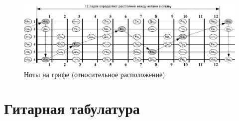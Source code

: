 \begin{figure}[!ht]
    \centering
    \includegraphics[width=\textwidth]{fig/notes-on-griph} 
    \caption{Ноты на грифе (относительное расположение)}\label{fig:notesOnGriph}
\end{figure} 


\section{Гитарная табулатура}


